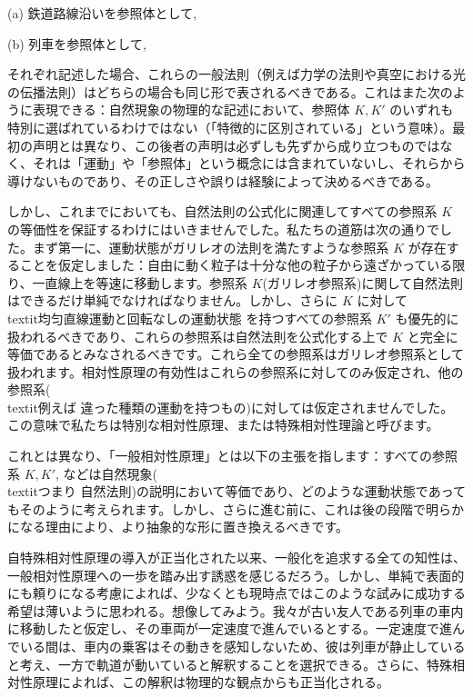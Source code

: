 \documentclass[a4paper,11pt,openany]{ltjsbook}
\begin{document}
(a) 鉄道路線沿いを参照体として,

(b) 列車を参照体として,

それぞれ記述した場合、これらの一般法則（例えば力学の法則や真空における光の伝播法則）はどちらの場合も同じ形で表されるべきである。これはまた次のように表現できる：自然現象の物理的な記述において、参照体 $K, K′$ のいずれも特別に選ばれているわけではない（「特徴的に区別されている」という意味）。最初の声明とは異なり、この後者の声明は必ずしも先ずから成り立つものではなく、それは「運動」や「参照体」という概念には含まれていないし、それらから導けないものであり、その正しさや誤りは経験によって決めるべきである。

しかし、これまでにおいても、自然法則の公式化に関連してすべての参照系 $K$ の等価性を保証するわけにはいきませんでした。私たちの道筋は次の通りでした。まず第一に、運動状態がガリレオの法則を満たすような参照系 $K$ が存在することを仮定しました：自由に動く粒子は十分な他の粒子から遠ざかっている限り、一直線上を等速に移動します。参照系 $K$(ガリレオ参照系)に関して自然法則はできるだけ単純でなければなりません。しかし、さらに $K$ に対して \\textit{均匀直線運動と回転なしの運動状態} を持つすべての参照系 $K′$ も優先的に扱われるべきであり、これらの参照系は自然法則を公式化する上で $K$ と完全に等価であるとみなされるべきです。これら全ての参照系はガリレオ参照系として扱われます。相対性原理の有効性はこれらの参照系に対してのみ仮定され、他の参照系(\\textit{例えば} 違った種類の運動を持つもの)に対しては仮定されませんでした。この意味で私たちは特別な相対性原理、または特殊相対性理論と呼びます。

これとは異なり、「一般相対性原理」とは以下の主張を指します：すべての参照系 $K, K′$, などは自然現象(\\textit{つまり} 自然法則)の説明において等価であり、どのような運動状態であってもそのように考えられます。しかし、さらに進む前に、これは後の段階で明らかになる理由により、より抽象的な形に置き換えるべきです。

自特殊相対性原理の導入が正当化された以来、一般化を追求する全ての知性は、一般相対性原理への一歩を踏み出す誘惑を感じるだろう。しかし、単純で表面的にも頼りになる考慮によれば、少なくとも現時点ではこのような試みに成功する希望は薄いように思われる。想像してみよう。我々が古い友人である列車の車内に移動したと仮定し、その車両が一定速度で進んでいるとする。一定速度で進んでいる間は、車内の乗客はその動きを感知しないため、彼は列車が静止していると考え、一方で軌道が動いていると解釈することを選択できる。さらに、特殊相対性原理によれば、この解釈は物理的な観点からも正当化される。
\end{document}
